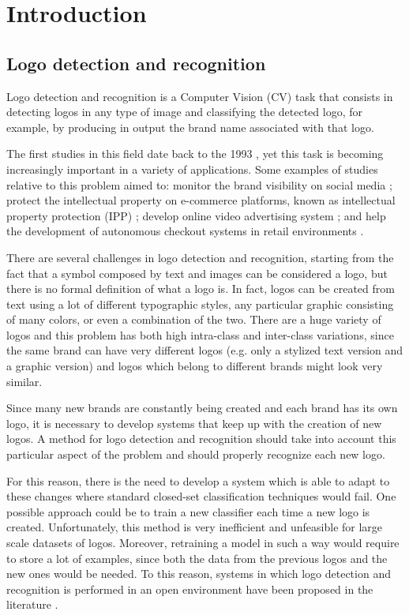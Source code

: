 \chapter{Introduction}
\label{chap:introduction}

\section{Logo detection and recognition}
\label{sec:logodet-intro}

Logo detection and recognition is a Computer Vision (CV) task that consists in detecting logos in any type of image and classifying the detected logo, for example, by producing in output the brand name associated with that logo. 

The first studies in this field date back to the 1993 \cite{doermann1993logo}, yet this task is becoming increasingly important in a variety of applications. Some examples of studies relative to this problem aimed to: monitor the brand visibility on social media \cite{7492197}; protect the intellectual property on e-commerce platforms, known as intellectual property protection (IPP) \cite{jin2020open}; develop online video advertising system \cite{cheng2017video}; and help the development of autonomous checkout systems in retail environments \cite{mata2022standardsim}.

There are several challenges in logo detection and recognition, starting from the fact that a symbol composed by text and images can be considered a logo, but there is no formal definition of what a logo is. In fact, logos can be created from text using a lot of different typographic styles, any particular graphic consisting of many colors, or even a combination of the two.
There are a huge variety of logos and this problem has both high intra-class and inter-class variations, since the same brand can have very different logos (e.g. only a stylized text version and a graphic version) and logos which belong to different brands might look very similar.

Since many new brands are constantly being created and each brand has its own logo, it is necessary to develop systems that keep up with the creation of new logos. A method for logo detection and recognition should take into account this particular aspect of the problem and should properly recognize each new logo.

For this reason, there is the need to develop a system which is able to adapt to these changes where standard closed-set classification techniques would fail. One possible approach could be to train a new classifier each time a new logo is created. Unfortunately, this method is very inefficient and unfeasible for large scale datasets of logos. Moreover, retraining a model in such a way would require to store a lot of examples, since both the data from the previous logos and the new ones would be needed. To this reason, systems in which logo detection and recognition is performed in an open environment have been proposed in the literature \cite{fehervari2019scalable, li2022seetek}.

